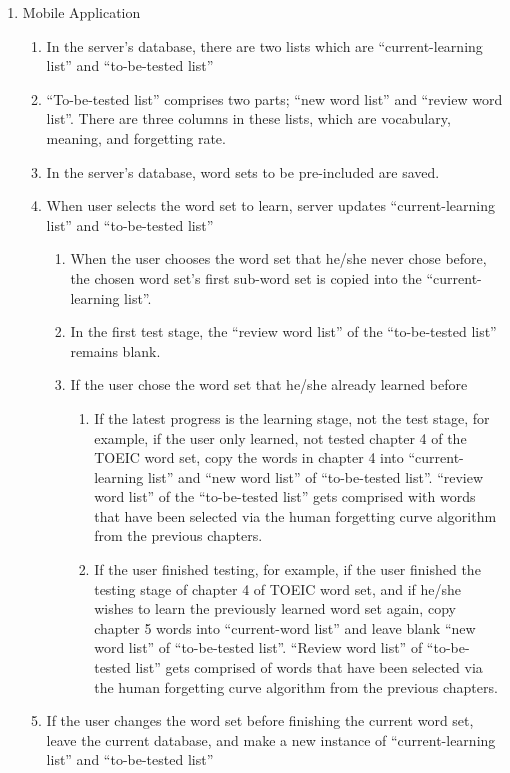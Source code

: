 \documentclass[conference]{IEEEtran}
\begin{document}
\begin{enumerate}
    \item Mobile Application
    \begin{enumerate}
        \item In the server’s database, there are two lists which are “current-learning list” and “to-be-tested list”
        \item “To-be-tested list” comprises two parts; “new word list” and “review word list”. There are three columns in these lists, which are vocabulary, meaning, and forgetting rate.
        \item In the server’s database, word sets to be pre-included are saved.
        \item When user selects the word set to learn, server updates “current-learning list” and “to-be-tested list”
        \begin{enumerate}
            \item When the user chooses the word set that he/she never chose before, the chosen word set’s first sub-word set is copied into the “current-learning list”.
            \item In the first test stage, the “review word list” of the “to-be-tested list” remains blank.
            \item If the user chose the word set that he/she already learned before
            \begin{enumerate}
                \item If the latest progress is the learning stage, not the test stage, for example, if the user only learned, not tested chapter 4 of the TOEIC word set, copy the words in chapter 4 into “current-learning list” and “new word list” of “to-be-tested list”. “review word list” of the “to-be-tested list” gets comprised with words that have been selected via the human forgetting curve algorithm from the previous chapters.
                \item If the user finished testing, for example, if the user finished the testing stage of chapter 4 of TOEIC word set, and if he/she wishes to learn the previously learned word set again, copy chapter 5 words into “current-word list” and leave blank “new word list” of “to-be-tested list”. “Review word list” of “to-be-tested list” gets comprised of words that have been selected via the human forgetting curve algorithm from the previous chapters.
            \end{enumerate}
        \end{enumerate}
        \item If the user changes the word set before finishing the current word set, leave the current database, and make a new instance of “current-learning list” and “to-be-tested list”

\end{enumerate}
\end{enumerate}
\end{document}
